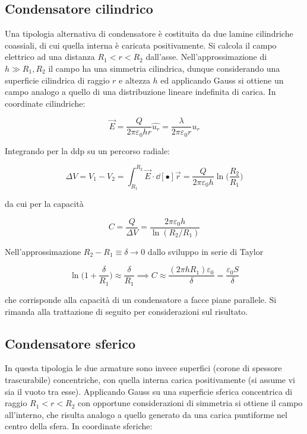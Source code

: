 \subsection{Condensatore cilindrico}

Una tipologia alternativa di condensatore è costituita da due lamine cilindriche coassiali, di cui quella interna è caricata positivamente. Si calcola il campo elettrico ad una distanza $R_1 < r < R_2$ dall'asse. Nell'approssimazione di $h \gg R_1, R_2$ il campo ha una simmetria cilindrica, dunque considerando una superficie cilindrica di raggio $r$ e altezza $h$ ed applicando Gauss si ottiene un campo analogo a quello di una distribuzione lineare indefinita di carica. In coordinate cilindriche:

\[\vec{E} = \frac{Q}{2 \pi \varepsilon_0 h r} \hat{u_r} = \frac{\lambda}{2 \pi \varepsilon_0 r} \hat{u_r}\]

Integrando per la ddp su un percorso radiale:

\[\Delta V = V_1 - V_2 = \int_{R_1}^{R_2} \vec{E} \cdot \dd[•]{\vec{r}} = \frac{Q}{2 \pi \varepsilon_0 h} \ln \bigg( \frac{R_2}{R_1} \bigg)\]

da cui per la capacità

\[C = \frac{Q}{\Delta V} = \frac{2 \pi \varepsilon_0 h}{\ln(R_2/R_1)}\]

Nell'approssimazione $R_2 - R_1 \equiv \delta \rightarrow 0$ dallo sviluppo in serie di Taylor

\[\ln \bigg( 1 +\frac{\delta}{R_1} \bigg) \approx \frac{\delta}{R_1} \implies C \approx \frac{(2 \pi h R_1) \varepsilon_0}{\delta} = \frac{\varepsilon_0 S}{\delta}\]

che corrisponde alla capacità di un condensatore a facce piane parallele. Si rimanda alla trattazione di seguito per considerazioni sul risultato.


\subsection{Condensatore sferico}

In questa tipologia le due armature sono invece superfici (corone di spessore trascurabile) concentriche, con quella interna carica positivamente (si assume vi sia il vuoto tra esse). Applicando Gauss su una superficie sferica concentrica di raggio $R_1 < r < R_2$ con opportune considerazioni di simmetria si ottiene il campo all'interno, che risulta analogo a quello generato da una carica puntiforme nel centro della sfera. In coordinate sferiche:

